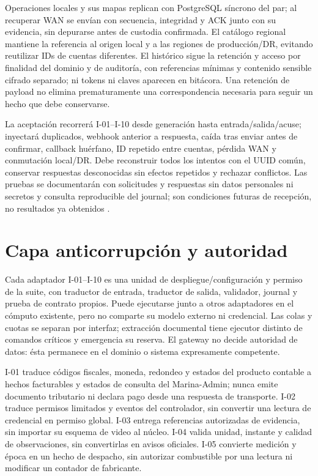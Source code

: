 Operaciones locales y sus mapas replican con PostgreSQL síncrono del par; al recuperar WAN se envían con secuencia, integridad y ACK junto con su evidencia, sin depurarse antes de custodia confirmada. El catálogo regional mantiene la referencia al origen local y a las regiones de producción/DR, evitando reutilizar IDs de cuentas diferentes. El histórico sigue la retención y acceso por finalidad del dominio y de auditoría, con referencias mínimas y contenido sensible cifrado separado; ni tokens ni claves aparecen en bitácora. Una retención de payload no elimina prematuramente una correspondencia necesaria para seguir un hecho que debe conservarse.

La aceptación recorrerá I-01--I-10 desde generación hasta entrada/salida/acuse; inyectará duplicados, webhook anterior a respuesta, caída tras enviar antes de confirmar, callback huérfano, ID repetido entre cuentas, pérdida WAN y conmutación local/DR. Debe reconstruir todos los intentos con el UUID común, conservar respuestas desconocidas sin efectos repetidos y rechazar conflictos. Las pruebas se documentarán con solicitudes y respuestas sin datos personales ni secretos y consulta reproducible del journal; son condiciones futuras de recepción, no resultados ya obtenidos \parencite[RT-05.19, p.~12]{pucv-transversal}.

\section*{Capa anticorrupción y autoridad}
\label{sec:a42-anticorrupcion}

Cada adaptador I-01--I-10 es una unidad de despliegue/configuración y permiso de la suite, con traductor de entrada, traductor de salida, validador, journal y prueba de contrato propios. Puede ejecutarse junto a otros adaptadores en el cómputo existente, pero no comparte su modelo externo ni credencial. Las colas y cuotas se separan por interfaz; extracción documental tiene ejecutor distinto de comandos críticos y emergencia su reserva. El gateway no decide autoridad de datos: ésta permanece en el dominio o sistema expresamente competente.

I-01 traduce códigos fiscales, moneda, redondeo y estados del producto contable a hechos facturables y estados de consulta del Marina-Admin; nunca emite documento tributario ni declara pago desde una respuesta de transporte. I-02 traduce permisos limitados y eventos del controlador, sin convertir una lectura de credencial en permiso global. I-03 entrega referencias autorizadas de evidencia, sin importar su esquema de video al núcleo. I-04 valida unidad, instante y calidad de observaciones, sin convertirlas en avisos oficiales. I-05 convierte medición y época en un hecho de despacho, sin autorizar combustible por una lectura ni modificar un contador de fabricante.

